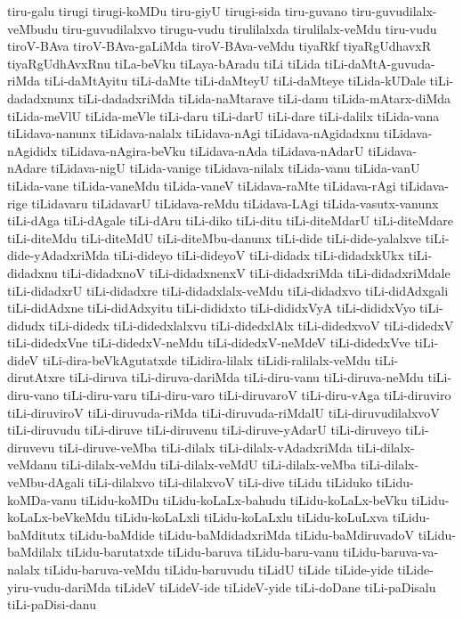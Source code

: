 {tiru-galu
tirugi
tirugi-koMDu
tiru-giyU
tirugi-sida
tiru-guvano
tiru-guvudilalx-veMbudu
tiru-guvudilalxvo
tirugu-vudu
tirulilalxda
tirulilalx-veMdu
tiru-vudu
tiroV-BAva
tiroV-BAva-gaLiMda
tiroV-BAva-veMdu
tiyaRkf
tiyaRgUdhavxR
tiyaRgUdhAvxRnu
tiLa-beVku
tiLaya-bAradu
tiLi
tiLida
tiLi-daMtA-guvuda-riMda
tiLi-daMtAyitu
tiLi-daMte
tiLi-daMteyU
tiLi-daMteye
tiLida-kUDale
tiLi-dadadxnunx
tiLi-dadadxriMda
tiLida-naMtarave
tiLi-danu
tiLida-mAtarx-diMda
tiLida-meVlU
tiLida-meVle
tiLi-daru
tiLi-darU
tiLi-dare
tiLi-dalilx
tiLida-vana
tiLidava-nanunx
tiLidava-nalalx
tiLidava-nAgi
tiLidava-nAgidadxnu
tiLidava-nAgididx
tiLidava-nAgira-beVku
tiLidava-nAda
tiLidava-nAdarU
tiLidava-nAdare
tiLidava-nigU
tiLida-vanige
tiLidava-nilalx
tiLida-vanu
tiLida-vanU
tiLida-vane
tiLida-vaneMdu
tiLida-vaneV
tiLidava-raMte
tiLidava-rAgi
tiLidava-rige
tiLidavaru
tiLidavarU
tiLidava-reMdu
tiLidava-LAgi
tiLida-vasutx-vanunx
tiLi-dAga
tiLi-dAgale
tiLi-dAru
tiLi-diko
tiLi-ditu
tiLi-diteMdarU
tiLi-diteMdare
tiLi-diteMdu
tiLi-diteMdU
tiLi-diteMbu-danunx
tiLi-dide
tiLi-dide-yalalxve
tiLi-dide-yAdadxriMda
tiLi-dideyo
tiLi-dideyoV
tiLi-didadx
tiLi-didadxkUkx
tiLi-didadxnu
tiLi-didadxnoV
tiLi-didadxnenxV
tiLi-didadxriMda
tiLi-didadxriMdale
tiLi-didadxrU
tiLi-didadxre
tiLi-didadxlalx-veMdu
tiLi-didadxvo
tiLi-didAdxgali
tiLi-didAdxne
tiLi-didAdxyitu
tiLi-dididxto
tiLi-dididxVyA
tiLi-dididxVyo
tiLi-didudx
tiLi-didedx
tiLi-didedxlalxvu
tiLi-didedxlAlx
tiLi-didedxvoV
tiLi-didedxV
tiLi-didedxVne
tiLi-didedxV-neMdu
tiLi-didedxV-neMdeV
tiLi-didedxVve
tiLi-dideV
tiLi-dira-beVkAgutatxde
tiLidira-lilalx
tiLidi-ralilalx-veMdu
tiLi-dirutAtxre
tiLi-diruva
tiLi-diruva-dariMda
tiLi-diru-vanu
tiLi-diruva-neMdu
tiLi-diru-vano
tiLi-diru-varu
tiLi-diru-varo
tiLi-diruvaroV
tiLi-diru-vAga
tiLi-diruviro
tiLi-diruviroV
tiLi-diruvuda-riMda
tiLi-diruvuda-riMdalU
tiLi-diruvudilalxvoV
tiLi-diruvudu
tiLi-diruve
tiLi-diruvenu
tiLi-diruve-yAdarU
tiLi-diruveyo
tiLi-diruvevu
tiLi-diruve-veMba
tiLi-dilalx
tiLi-dilalx-vAdadxriMda
tiLi-dilalx-veMdanu
tiLi-dilalx-veMdu
tiLi-dilalx-veMdU
tiLi-dilalx-veMba
tiLi-dilalx-veMbu-dAgali
tiLi-dilalxvo
tiLi-dilalxvoV
tiLi-dive
tiLidu
tiLiduko
tiLidu-koMDa-vanu
tiLidu-koMDu
tiLidu-koLaLx-bahudu
tiLidu-koLaLx-beVku
tiLidu-koLaLx-beVkeMdu
tiLidu-koLaLxli
tiLidu-koLaLxlu
tiLidu-koLuLxva
tiLidu-baMditutx
tiLidu-baMdide
tiLidu-baMdidadxriMda
tiLidu-baMdiruvadoV
tiLidu-baMdilalx
tiLidu-barutatxde
tiLidu-baruva
tiLidu-baru-vanu
tiLidu-baruva-va-nalalx
tiLidu-baruva-veMdu
tiLidu-baruvudu
tiLidU
tiLide
tiLide-yide
tiLide-yiru-vudu-dariMda
tiLideV
tiLideV-ide
tiLideV-yide
tiLi-doDane
tiLi-paDisalu
tiLi-paDisi-danu
}

